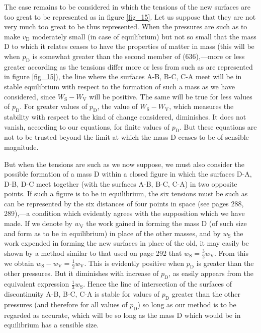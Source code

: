 \documentclass[12pt]{article}
\begin{document}
The case remains to be considered in which the tensions of the new surfaces are too great to be represented as in figure \ref{fig_15}. Let us suppose that they are not very much too great to be thus represented. When the pressures are such as to make $v_\text{D}$ moderately small (in case of equilibrium) but not so small that the mass D to which it relates ceases to have the properties of matter in mass (this will be when $p_\text{D}$ is somewhat greater than the second member of (636),---more or less greater according as the tensions differ more or less from such as are represented in figure \ref{fig_15}), the line where the surfaces A-B, B-C, C-A meet will be in stable equilibrium with respect to the formation of such a mass as we have considered, since $W_\text{S}-W_\text{V}$ will be positive. The same will be true for less values of $p_\text{D}$. For greater values of $p_\text{D}$, the value of $W_\text{S}-W_\text{V}$, which measures the stability with respect to the kind of change considered, diminishes. It does not vanish, according to our equations, for finite values of $p_\text{D}$. But these equations are not to be trusted beyond the limit at which the mass D ceases to be of sensible magnitude.

But when the tensions are such as we now suppose, we must also consider the possible formation of a mass D within a closed figure in which the surfaces D-A, D-B, D-C meet together (with the surfaces A-B, B-C, C-A) in two opposite points. If such a figure is to be in equilibrium, the six tensions must be such as can be represented by the six distances of four points in space (see pages 288, 289),---a condition which evidently agrees with the supposition which we have made. If we denote by $w_\text{V}$ the work gained in forming the mass D (of such size and form as to be in equilibrium) in place of the other masses, and by $w_\text{S}$ the work expended in forming the new surfaces in place of the old, it may easily be shown by a method similar to that used on page 292 that $w_\text{S}=\tfrac{3}{2}w_\text{V}$. From  this we obtain $w_\text{S}-w_\text{V} = \tfrac{1}{2}w_\text{V}.$ This is evidently positive when $p_\text{D}$ is greater than the other pressures. But it diminishes with increase of $p_\text{D}$, as easily appears from the equivalent expression $\tfrac{1}{3}w_\text{S}$. Hence the line of intersection of the surfaces of discontinuity A-B, B-C, C-A is stable for values of $p_\text{D}$ greater than the other pressures (and therefore for all values of $p_\text{D}$) so long as our method is to be regarded as accurate, which will be so long as the mass D which would be in equilibrium has a sensible size. 
\end{document}
